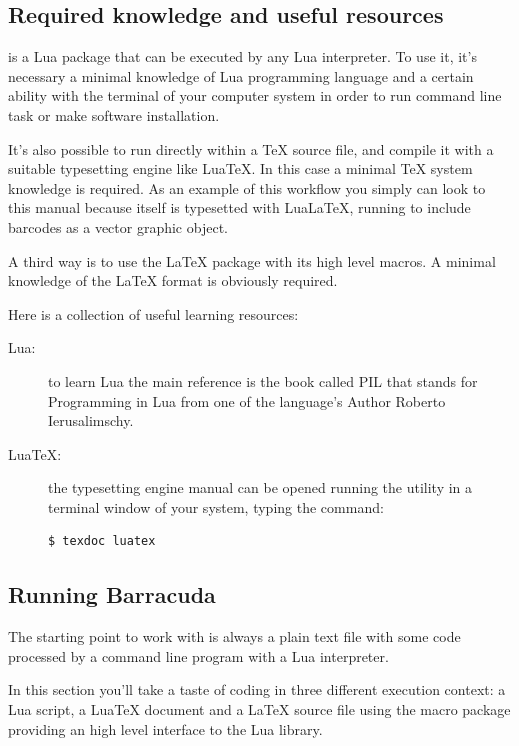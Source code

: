 \documentclass[11pt,a4paper]{article}
\begin{document}
\subsection{Required knowledge and useful resources}

\brcd{} is a Lua package that can be executed by any Lua interpreter. To use it,
it's necessary a minimal knowledge of Lua programming language and a certain
ability with the terminal of your computer system in order to run command line
task or make software installation.

It's also possible to run \brcd{} directly within a \TeX{} source file, and
compile it with a suitable typesetting engine like Lua\TeX{}. In this case a
minimal \TeX{} system knowledge is required. As an example of this workflow you
simply can look to this manual because itself is typesetted with LuaLa\TeX{},
running \brcd{} to include barcodes as a vector graphic object.

A third way is to use the \LaTeX{} package  with its high
level macros. A minimal knowledge of the \LaTeX{} format is obviously required.

Here is a collection of useful learning resources:
\begin{description}
\item[Lua:] to learn Lua the main reference is the book called PIL that stands
for Programming in Lua from one of the language's Author Roberto Ierusalimschy.
\item[Lua\TeX:] the typesetting engine manual can be opened running the
 utility in a terminal window of your system, typing the command:
\begin{Verbatim}
$ texdoc luatex
\end{Verbatim}
\end{description}


\subsection{Running Barracuda}
\label{secEnter}

The starting point to work with \brcd{} is always a plain text file with some
code processed by a command line program with a Lua interpreter.

In this section you'll take a taste of \brcd{} coding in three different
execution context: a Lua script, a Lua\TeX{} document and a \LaTeX{} source file
using the macro package  providing an high level interface
to the Lua library.
\end{document}
